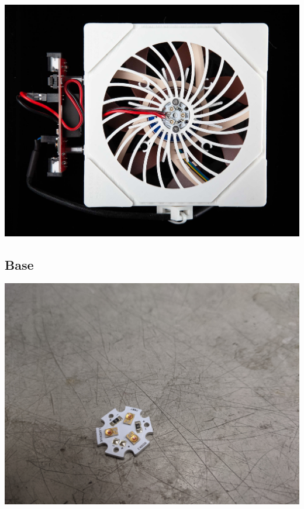 \documentclass[11pt]{article}
\begin{document}
\includegraphics[width=\textwidth]{"./assembly-coverart.jpg"}


\clearpage
\subsection{Base}

\begin{center}
  \includegraphics[width=\textwidth/2]{"./bare-led.jpg"}
\end{center}
\end{document}
